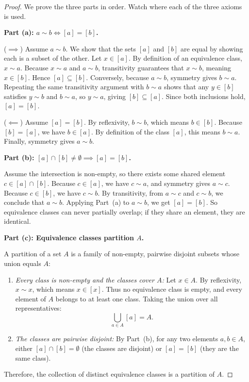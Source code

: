 \begin{proof}
We prove the three parts in order. Watch where each of the three axioms is used.

\textbf{Part (a): $a \sim b \iff [a] = [b]$.}

($\implies$) Assume $a \sim b$. We show that the sets $[a]$ and $[b]$ are equal by showing each is a subset of the other.
Let $x \in [a]$. By definition of an equivalence class, $x \sim a$. Because $x \sim a$ and $a \sim b$, transitivity guarantees that $x \sim b$, meaning $x \in [b]$. Hence $[a] \subseteq [b]$.
Conversely, because $a \sim b$, symmetry gives $b \sim a$. Repeating the same transitivity argument with $b \sim a$ shows that any $y \in [b]$ satisfies $y \sim b$ and $b \sim a$, so $y \sim a$, giving $[b] \subseteq [a]$.
Since both inclusions hold, $[a] = [b]$.

($\impliedby$) Assume $[a] = [b]$. By reflexivity, $b \sim b$, which means $b \in [b]$. Because $[b] = [a]$, we have $b \in [a]$. By definition of the class $[a]$, this means $b \sim a$. Finally, symmetry gives $a \sim b$.

\textbf{Part (b): $[a] \cap [b] \neq \emptyset \implies [a] = [b]$.}

Assume the intersection is non-empty, so there exists some shared element $c \in [a] \cap [b]$.
Because $c \in [a]$, we have $c \sim a$, and symmetry gives $a \sim c$.
Because $c \in [b]$, we have $c \sim b$.
By transitivity, from $a \sim c$ and $c \sim b$, we conclude that $a \sim b$.
Applying Part~(a) to $a \sim b$, we get $[a] = [b]$. 
So equivalence classes can never partially overlap; if they share an element, they are identical.

\textbf{Part (c): Equivalence classes partition $A$.}

A partition of a set $A$ is a family of non-empty, pairwise disjoint subsets whose union equals $A$:
\begin{enumerate}[label=\arabic*.]
\item \emph{Every class is non-empty and the classes cover $A$:} Let $x \in A$. By reflexivity, $x \sim x$, which means $x \in [x]$. Thus no equivalence class is empty, and every element of $A$ belongs to at least one class. Taking the union over all representatives:
\[
\bigcup_{a \in A} [a] = A.
\]
\item \emph{The classes are pairwise disjoint:} By Part~(b), for any two elements $a, b \in A$, either $[a] \cap [b] = \emptyset$ (the classes are disjoint) or $[a] = [b]$ (they are the same class).
\end{enumerate}
Therefore, the collection of distinct equivalence classes is a partition of $A$.
\end{proof}

